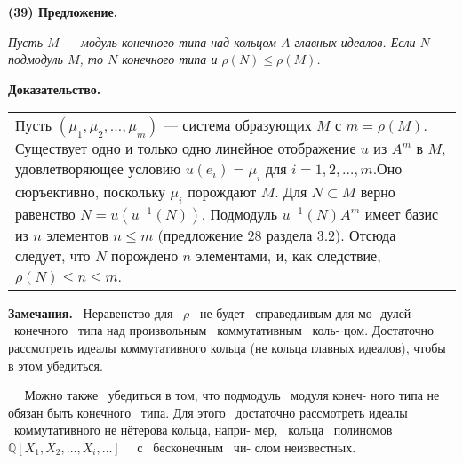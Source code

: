 \documentclass{mai_book}
\begin{document}
	
	\noindent
	{\bf (39) Предложение.}
	
	{\it Пусть $M$ — модуль конечного типа над кольцом $A$ главных идеалов.\linebreak
	Если $N$ — подмодуль $M$, то $N$ конечного типа и $\rho(N) \leqslant \rho(M)$.}
	
	\noindent
	{\bf Доказательство.}
	
	\begin{tabular}{|p{12.5cm}}
	\noindent
	Пусть $(\mu_1, \mu_2, \ldots, \mu_m)$ — система образующих $M$ с $m = \rho(M)$.\linebreak
	Существует одно и только одно линейное отображение $u$ из $A^m$ в\linebreak
	$M$, удовлетворяющее условию $u(e_i) = \mu_i$ для $i = 1,2, \ldots ,m$.Оно\linebreak
	сюръективно, поскольку $\mu_i$ порождают $M$.\newline
	Для $N \subset M$ верно равенство $N = u(u^{-1}(N))$. Подмодуль $u^{-1}(N) A^m$\linebreak
	имеет базис из $n$ элементов $n \leqslant m$ (предложение 28 раздела 3.2).\linebreak
	Отсюда следует, что $N$ порождено $n$ элементами, и, как следствие,\linebreak
	$\rho(N) \leqslant n\leqslant m$.
	\end{tabular}
	
	\begin{flushleft}
		\hangindent=1cm  \noindent
		{\small {\bf Замечания.} \ Неравенство для \ $\rho$ \ не будет \ справедливым для мо-\linebreak
			дулей \ конечного \ типа над произвольным \ коммутативным \ коль-\linebreak
			цом. Достаточно рассмотреть идеалы коммутативного кольца (не\linebreak
			кольца главных идеалов), чтобы в этом убедиться.
			
			${\ \ \ \ \ \ }$Можно также \ убедиться в том, что подмодуль \ модуля конеч-\linebreak
			ного типа не обязан быть конечного \ типа. Для этого \ достаточно\linebreak
			рассмотреть идеалы \ коммутативного не нётерова кольца, напри-\linebreak
			мер, \ кольца \ полиномов \ \ $\mathbb Q[X_1, X_2, \ldots, X_i, \ldots]$ \ \ с \ бесконечным \ чи-\linebreak
			слом неизвестных.}
	\end{flushleft}
	
\end{document}
